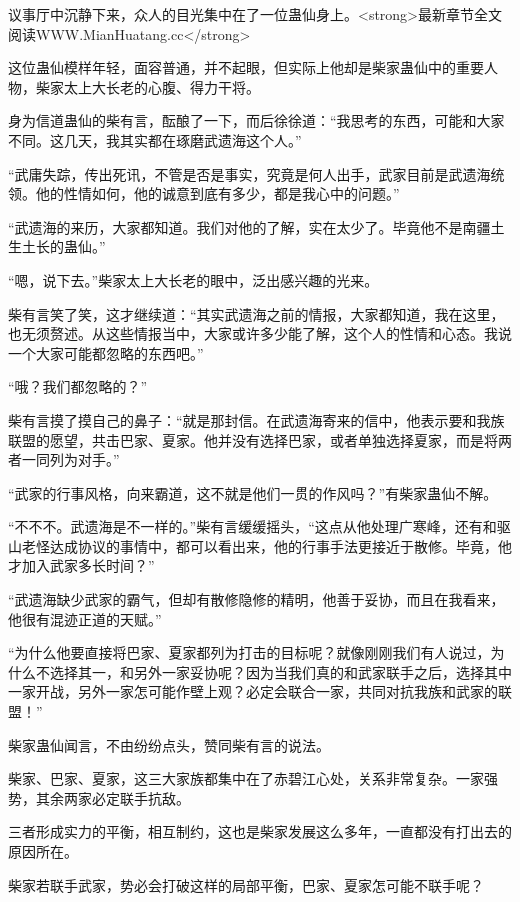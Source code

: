 
\begin{this_body}

议事厅中沉静下来，众人的目光集中在了一位蛊仙身上。<strong>最新章节全文阅读WWW.MianHuatang.cc</strong>

这位蛊仙模样年轻，面容普通，并不起眼，但实际上他却是柴家蛊仙中的重要人物，柴家太上大长老的心腹、得力干将。

身为信道蛊仙的柴有言，酝酿了一下，而后徐徐道：“我思考的东西，可能和大家不同。这几天，我其实都在琢磨武遗海这个人。”

“武庸失踪，传出死讯，不管是否是事实，究竟是何人出手，武家目前是武遗海统领。他的性情如何，他的诚意到底有多少，都是我心中的问题。”

“武遗海的来历，大家都知道。我们对他的了解，实在太少了。毕竟他不是南疆土生土长的蛊仙。”

“嗯，说下去。”柴家太上大长老的眼中，泛出感兴趣的光来。

柴有言笑了笑，这才继续道：“其实武遗海之前的情报，大家都知道，我在这里，也无须赘述。从这些情报当中，大家或许多少能了解，这个人的性情和心态。我说一个大家可能都忽略的东西吧。”

“哦？我们都忽略的？”

柴有言摸了摸自己的鼻子：“就是那封信。在武遗海寄来的信中，他表示要和我族联盟的愿望，共击巴家、夏家。他并没有选择巴家，或者单独选择夏家，而是将两者一同列为对手。”

“武家的行事风格，向来霸道，这不就是他们一贯的作风吗？”有柴家蛊仙不解。

“不不不。武遗海是不一样的。”柴有言缓缓摇头，“这点从他处理广寒峰，还有和驱山老怪达成协议的事情中，都可以看出来，他的行事手法更接近于散修。毕竟，他才加入武家多长时间？”

“武遗海缺少武家的霸气，但却有散修隐修的精明，他善于妥协，而且在我看来，他很有混迹正道的天赋。”

“为什么他要直接将巴家、夏家都列为打击的目标呢？就像刚刚我们有人说过，为什么不选择其一，和另外一家妥协呢？因为当我们真的和武家联手之后，选择其中一家开战，另外一家怎可能作壁上观？必定会联合一家，共同对抗我族和武家的联盟！”

柴家蛊仙闻言，不由纷纷点头，赞同柴有言的说法。

柴家、巴家、夏家，这三大家族都集中在了赤碧江心处，关系非常复杂。一家强势，其余两家必定联手抗敌。

三者形成实力的平衡，相互制约，这也是柴家发展这么多年，一直都没有打出去的原因所在。

柴家若联手武家，势必会打破这样的局部平衡，巴家、夏家怎可能不联手呢？


\end{this_body}
